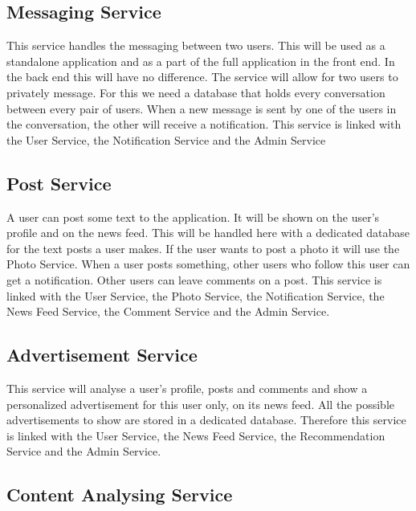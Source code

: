 \documentclass[a4paper,12pt]{article}
\begin{document}
\subsection{Messaging Service}

This service handles the messaging between two users. This will be used as a standalone application and as a part of the full application in the front end. In the back end this will have no difference. The service will allow for two users to privately message. For this we need a database that holds every conversation between every pair of users. When a new message is sent by one of the users in the conversation, the other will receive a notification.
\newline
\newline
This service is linked with the User Service, the Notification Service and the Admin Service

\subsection{Post Service}

A user can post some text to the application. It will be shown on the user's profile and on the news feed. This will be handled here with a dedicated database for the text posts a user makes. If the user wants to post a photo it will use the Photo Service. When a user posts something, other users who follow this user can get a notification. Other users can leave comments on a post.\newline
\newline
This service is linked with the User Service, the Photo Service, the Notification Service, the News Feed Service, the Comment Service and the Admin Service.

\subsection{Advertisement Service}

This service will analyse a user's profile, posts and comments and show a personalized advertisement for this user only, on its news feed. All the possible advertisements to show are stored in a dedicated database.
\newline
\newline
Therefore this service is linked with the User Service, the News Feed Service, the Recommendation Service and the Admin Service.

\subsection{Content Analysing Service}
\end{document}
